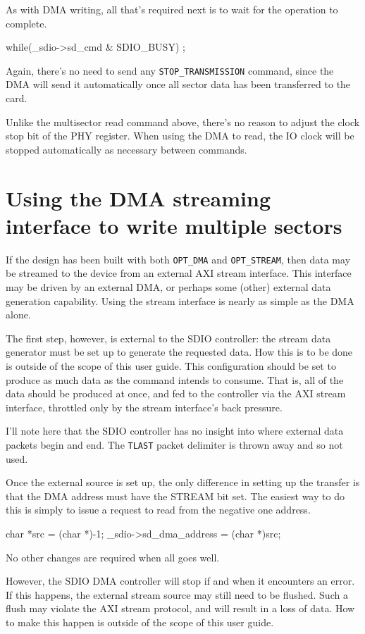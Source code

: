 \documentclass{gqtekspec}
\begin{document}
As with DMA writing, all that's required next is to wait for the operation to
complete.

\begin{zCpp}
	while(_sdio->sd_cmd & SDIO_BUSY)
		;
\end{zCpp}

Again, there's no need to send any {\tt STOP\_TRANSMISSION} command, since the
DMA will send it automatically once all sector data has been transferred to the
card. 

Unlike the multisector read command above, there's no reason to adjust the
clock stop bit of the PHY register.  When using the DMA to read, the IO clock
will be stopped automatically as necessary between commands.
\section{Using the DMA streaming interface to write multiple sectors}
If the design has been built with both {\tt OPT\_DMA} and
{\tt OPT\_STREAM}, then data may be streamed to the device from an
external AXI stream interface.  This interface may be driven by
an external DMA, or perhaps some (other) external data generation
capability.  Using the stream interface is nearly as simple as the
DMA alone.

The first step, however, is external to the SDIO controller: the stream
data generator must be set up to generate the requested data.  How
this is to be done is outside of the scope of this user guide.  This
configuration should be set to produce as much data as the command intends
to consume.  That is, all of the data should be produced at once, and
fed to the controller via the AXI stream interface, throttled only by the
stream interface's back pressure.

I'll note here that the SDIO controller has no insight into where
external data packets begin and end.  The {\tt TLAST} packet delimiter
is thrown away and so not used.

Once the external source is set up, the only difference in setting up the
transfer is that the DMA address must have the STREAM bit set.  The easiest
way to do this is simply to issue a request to read from the negative
one address.
\begin{zCpp}
	char	*src = (char *)-1;
	_sdio->sd_dma_address = (char *)src;
\end{zCpp}

No other changes are required when all goes well.

However, the SDIO DMA controller will stop if and when it encounters an error.
If this happens, the external stream source may still need to be flushed.
Such a flush may violate the AXI stream protocol, and will result in a loss
of data.  How to make this happen is outside of the scope of this user guide.
\end{document}
